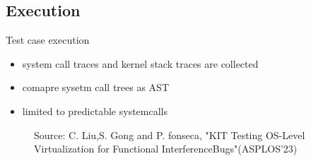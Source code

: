 \subsection{Execution}

\begin{frame}{Test case execution}{~}


\begin{minipage}{0.4 \textwidth}
    \begin{itemize}
    \setlength\itemsep{1em}
    \item system call traces and kernel stack traces are collected
    \item comapre sysetm call trees as AST
    \item limited to predictable systemcalls
\end{itemize}
\end{minipage}
\begin{minipage}{0.45\textwidth}
    \begin{figure}
        \center
    \def\stackalignment{l}
               {\scriptsize
                Source: C. Liu,S. Gong and P. fonseca, "KIT Testing }
                 {\scriptsize OS-Level Virtualization for Functional InterferenceBugs"(ASPLOS'23)}
    \end{figure}
            \end{minipage}


\end{frame}